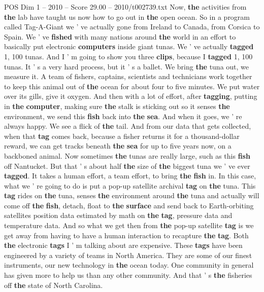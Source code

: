 \begin{textsample}{POS Dim 1 – 2010 – Score 29.00 – 2010/t002739.txt}
Now, \textbf{the} activities from \textbf{the} lab have taught us now how to go out in \textbf{the} open ocean.
So in a program called Tag-A-Giant we ' ve actually gone from Ireland to Canada, from Corsica to Spain.
We ' ve \textbf{fished} with many nations around \textbf{the} world in an effort to basically put electronic \textbf{computers} inside giant tunas.
We ' ve actually \textbf{tagged} 1, 100 tunas.
And I ' m going to show you three \textbf{clips}, because I \textbf{tagged} 1, 100 tunas.
It ' s a very hard process, but it ' s a ballet.
We bring \textbf{the} tuna out, we measure it.
A team of fishers, captains, scientists and technicians work together to keep this animal out of \textbf{the} ocean for about four to five minutes.
We put water over its gills, give it oxygen.
And then with a lot of effort, after \textbf{tagging}, putting in \textbf{the} \textbf{computer}, making sure \textbf{the} stalk is sticking out so it senses \textbf{the} environment, we send this \textbf{fish} back into \textbf{the} \textbf{sea}.
And when it goes, we ' re always happy.
We see a flick of \textbf{the} tail.
And from our data that gets collected, when that \textbf{tag} comes back, because a fisher returns it for a thousand-dollar reward, we can get tracks beneath \textbf{the} \textbf{sea} for up to five years now, on a backboned animal.
Now sometimes \textbf{the} tunas are really large, such as this \textbf{fish} off Nantucket.
But that ' s about half \textbf{the} size of \textbf{the} biggest tuna we ' ve ever \textbf{tagged}.
It takes a human effort, a team effort, to bring \textbf{the} \textbf{fish} in.
In this case, what we ' re going to do is put a pop-up satellite archival \textbf{tag} on \textbf{the} tuna.
This \textbf{tag} rides on \textbf{the} tuna, senses \textbf{the} environment around \textbf{the} tuna and actually will come off \textbf{the} \textbf{fish}, detach, float to \textbf{the} \textbf{surface} and send back to Earth-orbiting satellites position data estimated by math on \textbf{the} \textbf{tag}, pressure data and temperature data.
And so what we get then from \textbf{the} pop-up satellite \textbf{tag} is we get away from having to have a human interaction to recapture \textbf{the} \textbf{tag}.
Both \textbf{the} electronic \textbf{tags} I ' m talking about are expensive.
These \textbf{tags} have been engineered by a variety of teams in North America.
They are some of our finest instruments, our new technology in \textbf{the} ocean today.
One community in general has given more to help us than any other community.
And that ' s \textbf{the} fisheries off \textbf{the} state of North Carolina.

\end{textsample}
